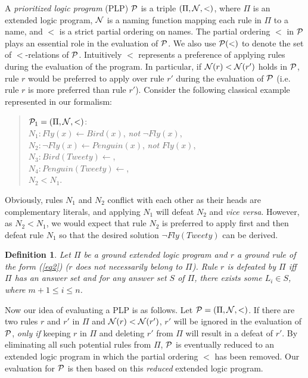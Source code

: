 \documentclass{tlp}
\newtheorem{definition}{Definition} %
\begin{document}
A {\em prioritized logic program} (PLP) ${\cal P}$ is a triple
$(\Pi,{\cal N},<)$, where
$\Pi$ is an extended logic program, $\cal N$ is a
naming function
mapping each rule in $\Pi$ to a name, and $<$ is a strict
partial ordering on names.
The partial ordering $<$ in ${\cal P}$ plays an essential role in
the evaluation of ${\cal P}$.
We also use ${\cal P}(<)$ to denote the set of $<$-relations of ${\cal P}$. 
Intuitively $<$ represents a preference
of applying rules during the evaluation of the program.
In particular, if
${\cal N}(r)<{\cal N}(r')$ holds in ${\cal P}$, rule $r$ would be
preferred to apply over rule $r'$ during the evaluation of ${\cal P}$
(i.e. rule $r$ is more preferred than rule $r'$).
Consider the following
classical example represented in our formalism:
\begin{quote}
${\cal P}_{1}=(\Pi,{\cal N},<)$:\\
\hspace*{.1in} $N_{1}: Fly(x)\leftarrow Bird(x)$, {\em not} $\neg Fly(x)$,\\
\hspace*{.1in} $N_{2}: \neg Fly(x)\leftarrow Penguin(x)$, {\em not} $Fly(x)$, \\
\hspace*{.1in} $N_{3}: Bird(Tweety)\leftarrow$,\\
\hspace*{.1in} $N_{4}: Penguin(Tweety)\leftarrow$,\\
\hspace*{.1in} $N_{2}<N_{1}$.
\end{quote}
Obviously, rules $N_{1}$ and $N_{2}$ conflict with each other
as their heads are complementary literals,
and applying $N_{1}$ will defeat
$N_{2}$ and {\em vice versa}.
However, as $N_{2}<N_{1}$, we would expect that rule $N_{2}$ is preferred
to apply first and then defeat rule $N_{1}$ so that
the desired solution $\neg Fly(Tweety)$ can be derived.

\begin{definition}
Let $\Pi$ be a ground extended logic program and $r$ a ground rule of the
form (\ref{eq2}) 
($r$ does not necessarily belong to $\Pi$).
Rule $r$ is {\em defeated}
by $\Pi$ iff $\Pi$ has an answer set and
for any answer set $S$ of $\Pi$,
there exists some $L_{i}\in S$, where $m+1\leq i\leq n$.
\end{definition}

Now our idea of evaluating a PLP is as follows.
Let ${\cal P}=(\Pi,{\cal N},<)$. If there are two rules
$r$ and $r'$ in $\Pi$ and ${\cal N}(r)<{\cal N}(r')$,
$r'$ will be ignored in the evaluation of ${\cal P}$, {\em only if}
keeping $r$ in $\Pi$ and deleting $r'$
from $\Pi$ will result in a defeat of $r'$.
By eliminating all such potential rules from $\Pi$,
$\cal P$ is eventually reduced to an extended logic program in which
the partial ordering $<$ has been removed. Our evaluation for
${\cal P}$ is then based on this {\em reduced} extended logic program.
\end{document}
